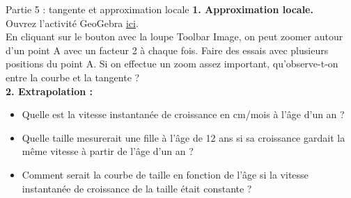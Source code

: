 \documentclass{beamer}
\begin{document}
\begin{frame}{Partie 5 : tangente et approximation locale}
 \textbf{1. Approximation locale.}\\[1ex]
 Ouvrez l’activité GeoGebra \href{https://www.geogebra.org/m/btx5btdu}{ici}.\\[1ex]
 En cliquant sur le bouton avec la loupe Toolbar Image, on peut zoomer autour d’un point A avec un facteur 2 à chaque fois. Faire des essais avec plusieurs positions du point A. Si on effectue un zoom assez important, qu’observe-t-on entre la courbe et la tangente ?\\[2ex]
 \textbf{2. Extrapolation :}
 \begin{itemize}
  \item[a.] Quelle est la vitesse instantanée de croissance en cm/mois à l’âge d’un an ?
  \item[b.] Quelle taille mesurerait une fille à l’âge de 12 ans si sa croissance gardait la même vitesse à partir de l’âge d’un an ?
  \item[c.] Comment serait la courbe de taille en fonction de l’âge si la vitesse instantanée de croissance de la taille était constante ?
 \end{itemize}
\end{frame}
\end{document}

